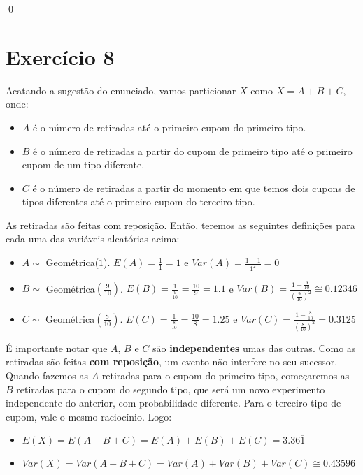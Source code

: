 \documentclass[12pt,letterpaper]{article}
\begin{document}
	\qed
	
	\section*{Exercício 8}
	
	Acatando a sugestão do enunciado, vamos particionar $X$ como $X = A+B+C$, onde:
	
	\begin{itemize}
		\item $A$ é o número de retiradas até o primeiro cupom do primeiro tipo.
		\item $B$ é o número de retiradas a partir do cupom de primeiro tipo até o primeiro cupom de um tipo diferente.
		\item $C$ é o número de retiradas a partir do momento em que temos dois cupons de tipos diferentes até o primeiro cupom do terceiro tipo.
	\end{itemize}
	
	As retiradas são feitas com reposição. Então, teremos as seguintes definições para cada uma das variáveis aleatórias acima:
	
	\begin{itemize}
		\item $A \sim$ Geométrica($1$). $E(A) = \frac{1}{1} = 1$ e $Var(A) = \frac{1-1}{1^2} = 0$
		\item $B \sim$ Geométrica$\left(\frac{9}{10}\right)$. $E(B) = \frac{1}{\frac{9}{10}} = \frac{10}{9} =1.\overline{1}$ e $Var(B) = \frac{1-\frac{9}{10}}{(\frac{9}{10})^2} \cong 0.12346$
		\item $C \sim$ Geométrica$\left(\frac{8}{10}\right)$. $E(C) = \frac{1}{\frac{8}{10}}= \frac{10}{8} = 1.25$ e $Var(C) = \frac{1-\frac{8}{10}}{(\frac{8}{10})^2} = 0.3125$
	\end{itemize}
	
	É importante notar que $A$, $B$ e $C$ são \textbf{independentes} umas das outras. Como as retiradas são feitas \textbf{com reposição}, um evento não interfere no seu sucessor. Quando fazemos as $A$ retiradas para o cupom do primeiro tipo, começaremos as $B$ retiradas para o cupom do segundo tipo, que será um novo experimento independente do anterior, com probabilidade diferente. Para o terceiro tipo de cupom, vale o mesmo raciocínio. Logo:
	
	\begin{itemize}
		\item $E(X) = E(A+B+C) = E(A) + E(B) + E(C) = 3.36\overline{1}$
		\item $Var(X) = Var(A+B+C) = Var(A) + Var(B) + Var(C) \cong 0.43596$
	\end{itemize}
			
	 
\end{document}
